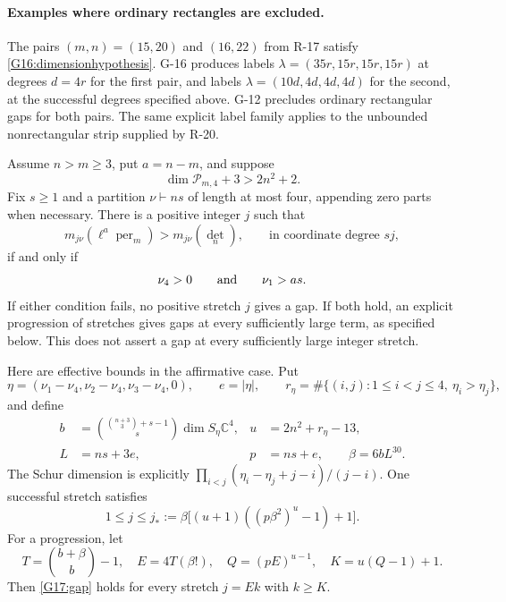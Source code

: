 \paragraph{Examples where ordinary rectangles are excluded.}
The pairs $(m,n)=(15,20)$ and $(16,22)$ from R-17 satisfy
\eqref{G16:dimensionhypothesis}. G-16 produces labels
$\lambda=(35r,15r,15r,15r)$ at degrees $d=4r$ for the first pair,
and labels $\lambda=(10d,4d,4d,4d)$ for the second, at the
successful degrees specified above. G-12 precludes ordinary
rectangular gaps for both pairs. The same explicit label family
applies to the unbounded nonrectangular strip supplied by R-20.


\begin{theorem}\label{G-17}
Assume $n>m\geq3$, put $a=n-m$, and suppose
\[
 \dim\mathcal P_{m,4}+3>2n^2+2.
\]
Fix $s\geq1$ and a partition $\nu\vdash ns$ of length at most four,
appending zero parts when necessary. There is a positive integer $j$
such that
\begin{equation}\label{G17:gap}
 m_{j\nu}(\ell^a\operatorname{per}_m)>m_{j\nu}(\det_n),
 \qquad\text{in coordinate degree }sj,
\end{equation}
if and only if
\begin{equation}\label{G17:criterion}
 \nu_4>0\qquad\hbox{and}\qquad\nu_1>as.
\end{equation}
If either condition fails, no positive stretch $j$ gives a gap.
If both hold, an explicit progression of stretches gives gaps at
every sufficiently large term, as specified below. This does not
assert a gap at every sufficiently large integer stretch.

Here are effective bounds in the affirmative case. Put
\[
 \eta=(\nu_1-\nu_4,\nu_2-\nu_4,\nu_3-\nu_4,0),\qquad e=|\eta|,
 \qquad r_\eta=\#\{(i,j):1\leq i<j\leq4,\ \eta_i>\eta_j\},
\]
and define
\[
 \begin{aligned}
 b&=\binom{\binom{n+3}{3}+s-1}{s}\dim S_\eta\mathbb C^4,
 &u&=2n^2+r_\eta-13,\\
 L&=ns+3e,&p&=ns+e,\qquad \beta=6bL^{30}.
 \end{aligned}
\]
The Schur dimension is explicitly
$\prod_{i<j}(\eta_i-\eta_j+j-i)/(j-i)$.
One successful stretch satisfies
\begin{equation}\label{G17:firststretch}
 1\leq j\leq
 j_*:=\beta\bigl[(u+1)((p\beta^2)^u-1)+1\bigr].
\end{equation}
For a progression, let
\[
 T=\binom{b+\beta}{b}-1,\quad E=4T(\beta!),\quad
 Q=(pE)^{u-1},\quad K=u(Q-1)+1.
\]
Then \eqref{G17:gap} holds for every stretch $j=Ek$ with $k\geq K$.
\end{theorem}

